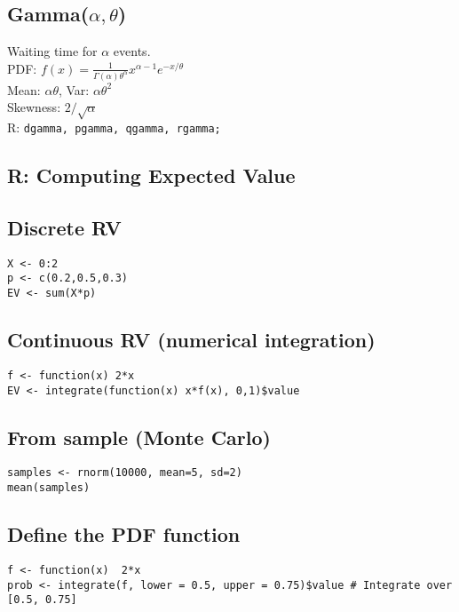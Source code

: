 \documentclass[7pt,landscape]{article}
\begin{document}
\begin{multicols}{3}
\subsection*{Gamma($\alpha,\theta$)}
Waiting time for $\alpha$ events. \\
PDF: $f(x)=\tfrac{1}{\Gamma(\alpha)\theta^\alpha} x^{\alpha-1} e^{-x/\theta}$ \\
Mean: $\alpha\theta$, Var: $\alpha\theta^2$ \\
Skewness: $2/\sqrt{\alpha}$ \\
R: \texttt{dgamma, pgamma, qgamma, rgamma;} \\

\subsection*{R: Computing Expected Value}

\subsection*{Discrete RV}
\texttt{X <- 0:2} \\
\texttt{p <- c(0.2,0.5,0.3)} \\
\texttt{EV <- sum(X*p)} \\

\subsection*{Continuous RV (numerical integration)}
\texttt{f <- function(x) 2*x} \\
\texttt{EV <- integrate(function(x) x*f(x), 0,1)\$value} \\

\subsection*{From sample (Monte Carlo)}
\texttt{samples <- rnorm(10000, mean=5, sd=2)} \\
\texttt{mean(samples)}  %

\subsection*{Define the PDF function}

\texttt{f <- function(x) { 2*x }} \\
\texttt{prob <- integrate(f, lower = 0.5, upper = 0.75)\$value \# Integrate over [0.5, 0.75]}

\end{multicols}
\end{document}
